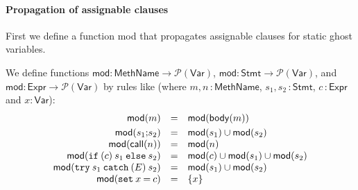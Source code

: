 \paragraph{Propagation of assignable clauses}
First we define a function \textsf{mod} that propagates
assignable clauses for static ghost variables.

\begin{definition}We define functions
\(\mathsf{mod} \colon \mathsf{MethName} \rightarrow
\mathcal{P}(\mathsf{Var})\), 
\(
\mathsf{mod}  \colon  \mathsf{Stmt}   \rightarrow
\mathcal{P}(\mathsf{Var}) \), and 
\(\mathsf{mod}  \colon  \mathsf{Expr}   \rightarrow  \mathcal{P}(\mathsf{Var})\)
by rules like (where \(m,n\,\colon\mathsf{MethName}\),
\(s_1,s_2\,\colon\mathsf{Stmt}\), \(c\,\colon\mathsf{Expr}\) and \(x\colon\mathsf{Var}\)):
\[
\begin{array}{rcl}
\mathsf{mod}(m) & = & \mathsf{mod}(\mathsf{body}(m)) \smallskip \\
\mathsf{mod}(s_1 \mathtt{;} s_2) & = & \mathsf{mod}(s_1) \cup \mathsf{mod}(s_2)\\
\mathsf{mod}(\mathsf{call}(n)) & = &  \mathsf{mod}(n) \\
\mathsf{mod}(\mathtt{if\:(} c \mathtt{)\:} s_1 \mathtt{\:else\:} s_2)
&=& \mathsf{mod}(c) \cup \mathsf{mod}(s_1) \cup \mathsf{mod}(s_2)\\
\mathsf{mod}(\mathtt{try\:} s_1 \mathtt{\:catch\:(} E \mathtt{)\:}
s_2) & = & \mathsf{mod}(s_1) \cup \mathsf{mod}(s_2)\\
\mathsf{mod}(\mathtt{set\:}x \mathtt{\:=\:} c) & = &  \{ x \} 
\end{array}
\]
\end{definition}


